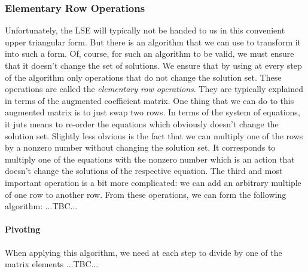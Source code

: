 \subsubsection{Elementary Row Operations}
Unfortunately, the LSE will typically not be handed to us in this convenient upper triangular form. But there is an algorithm that we can use to transform it into such a form. Of, course, for such an algorithm to be valid, we must ensure that it doesn't change the set of solutions. We ensure that by using at every step of the algorithm only operations that do not change the solution set. These operations are called the \emph{elementary row operations}. They are typically explained in terms of the augmented coefficient matrix. One thing that we can do to this augmented matrix is to just swap two rows. In terms of the system of equations, it juts means to re-order the equations which obviously doesn't change the solution set. Slightly less obvious is the fact that we can multiply one of the rows by a nonzero number without changing the solution set. It corresponds to multiply one of the equations with the nonzero number which is an action that doesn't change the solutions of the respective equation. The third and most important operation is a bit more complicated: we can add an arbitrary multiple of one row to another row. From these operations, we can form the following algorithm: ...TBC...






\paragraph{Pivoting}
When applying this algorithm, we need at each step to divide by one of the matrix elements ...TBC...

